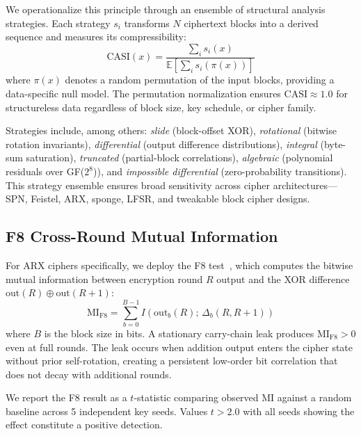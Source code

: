 \documentclass[conference]{IEEEtran}
\begin{document}
We operationalize this principle through an ensemble of structural analysis strategies.
Each strategy $s_i$ transforms $N$ ciphertext blocks into a derived sequence and measures its compressibility:
\begin{equation}
    \text{CASI}(x) = \frac{\sum_i s_i(x)}{\mathbb{E}\left[\sum_i s_i(\pi(x))\right]}
    \label{eq:casi}
\end{equation}
where $\pi(x)$ denotes a random permutation of the input blocks, providing a data-specific null model.
The permutation normalization ensures $\text{CASI} \approx 1.0$ for structureless data regardless of block size, key schedule, or cipher family.

Strategies include, among others: \emph{slide} (block-offset XOR), \emph{rotational} (bitwise rotation invariants), \emph{differential} (output difference distributions), \emph{integral} (byte-sum saturation), \emph{truncated} (partial-block correlations), \emph{algebraic} (polynomial residuals over GF($2^8$)), and \emph{impossible differential} (zero-probability transitions).
This strategy ensemble ensures broad sensitivity across cipher architectures---SPN, Feistel, ARX, sponge, LFSR, and tweakable block cipher designs.

\subsection{F8 Cross-Round Mutual Information}

For ARX ciphers specifically, we deploy the F8 test~\cite{foss2026icecet}, which computes the bitwise mutual information between encryption round $R$ output and the XOR difference $\text{out}(R) \oplus \text{out}(R+1)$:
\begin{equation}
    \text{MI}_{\text{F8}} = \sum_{b=0}^{B-1} I\!\left(\text{out}_b(R);\, \Delta_b(R, R+1)\right)
    \label{eq:f8}
\end{equation}
where $B$ is the block size in bits.
A stationary carry-chain leak produces $\text{MI}_{\text{F8}} > 0$ even at full rounds.
The leak occurs when addition output enters the cipher state without prior self-rotation, creating a persistent low-order bit correlation that does not decay with additional rounds.

We report the F8 result as a $t$-statistic comparing observed MI against a random baseline across 5 independent key seeds.
Values $t > 2.0$ with all seeds showing the effect constitute a positive detection.


\end{document}
